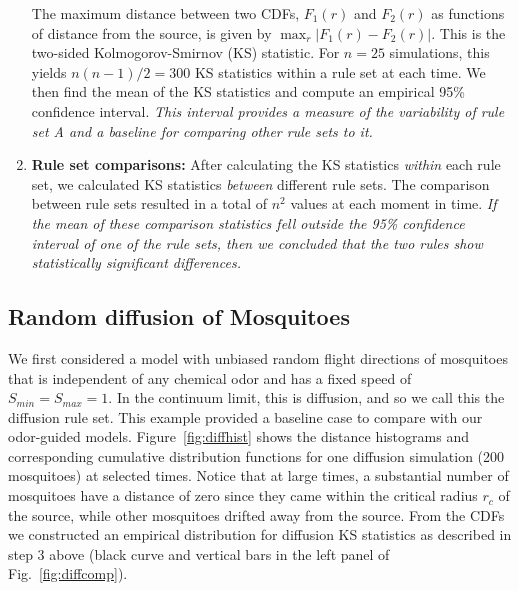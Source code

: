 \documentclass[12pt]{article}
\newif\ifcommentsw
\newcommand{\comment}[1]{\ifcommentsw  $\blacktriangleright$\ \textbf{#1}\ $\blacktriangleleft$ \fi}
\begin{document}
\begin{enumerate}
    The maximum distance between two CDFs, $F_1(r)$ and $F_2(r)$ as functions of distance from the source, is given by $\max_r|F_1(r)-F_2(r)|$. \comment{Ivo, does the inclusion of the previous sentence help? BC}
This is the two-sided
    Kolmogorov-Smirnov (KS) statistic. For $n=25$
    simulations, this yields $n(n-1)/2 = 300$ KS statistics
    within a rule set at each time. We then find the mean
    of the KS statistics and compute an empirical 95\%
    confidence interval.  \textit{This interval provides a
    measure of the variability of rule set A and a baseline
    for comparing other rule sets to it.}
\item
\textbf{Rule set comparisons:} After calculating the KS statistics \emph{within} each rule set, we calculated KS statistics \emph{between} different rule sets. The comparison between rule sets resulted in a total of $n^2$ values at each moment in time. \textit{If the mean of these comparison statistics fell outside the 95\% confidence interval of one of the rule sets, then we concluded that the two rules show statistically significant differences.}
\end{enumerate}

\subsection{Random diffusion of Mosquitoes}
We first considered a model with unbiased random flight directions of mosquitoes
that is independent of any chemical odor and has a fixed speed of
$S_{min} = S_{max} = 1$. In the continuum limit, this is diffusion, and so we call this the diffusion rule set. \comment{I thought we agreed on ``random walk''? But if you like diffusion that is fine with me... IF} \comment{I know that Mac is in favor of using both and I think it is a good idea too. We used unbiased random walk several times above. BC  I think that this is a good compromise.} This example provided
 a baseline case to compare with our odor-guided models.
Figure~\ref{fig:diffhist} shows the
distance histograms and corresponding cumulative distribution
functions for one diffusion simulation (200 mosquitoes) at
selected times. Notice that at large times, a substantial
number of mosquitoes have a distance of zero
since they came within the critical radius $r_c$ of the source,
while other mosquitoes drifted away from the source. From the
CDFs we constructed an empirical distribution for diffusion
KS statistics as described in step 3 above (black curve and
vertical bars in the left panel of Fig.~\ref{fig:diffcomp}).
\end{document}
